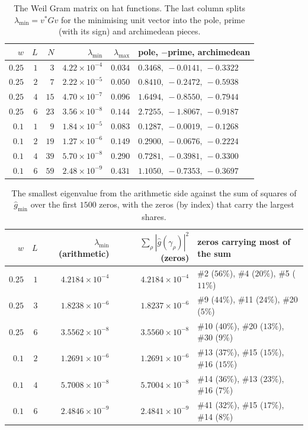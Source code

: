 \begin{table}[ht]
\centering\small
\begin{tabular}{@{}rrrrrl@{}}
\toprule
$w$ & $L$ & $N$ & $\lambda_{\min}$ & $\lambda_{\max}$ & pole, $-$prime, archimedean\\
\midrule
$0.25$ & $1$ & $3$ & $4.22\times10^{-4}$ & $0.034$ & $0.3468,\ -0.0141,\ -0.3322$\\
$0.25$ & $2$ & $7$ & $2.22\times10^{-5}$ & $0.050$ & $0.8410,\ -0.2472,\ -0.5938$\\
$0.25$ & $4$ & $15$ & $4.70\times10^{-7}$ & $0.096$ & $1.6494,\ -0.8550,\ -0.7944$\\
$0.25$ & $6$ & $23$ & $3.56\times10^{-8}$ & $0.144$ & $2.7255,\ -1.8067,\ -0.9187$\\
$0.1$ & $1$ & $9$ & $1.84\times10^{-5}$ & $0.083$ & $0.1287,\ -0.0019,\ -0.1268$\\
$0.1$ & $2$ & $19$ & $1.27\times10^{-6}$ & $0.149$ & $0.2900,\ -0.0676,\ -0.2224$\\
$0.1$ & $4$ & $39$ & $5.70\times10^{-8}$ & $0.290$ & $0.7281,\ -0.3981,\ -0.3300$\\
$0.1$ & $6$ & $59$ & $2.48\times10^{-9}$ & $0.431$ & $1.1050,\ -0.7353,\ -0.3697$\\
\bottomrule
\end{tabular}
\caption{The Weil Gram matrix on hat functions. The last column splits $\lambda_{\min}=v^*Gv$ for the minimising unit vector into the pole, prime (with its sign) and archimedean pieces.}
\label{cp:tab:weil}
\end{table}

\begin{table}[ht]
\centering\small
\begin{tabular}{@{}rrrrl@{}}
\toprule
$w$ & $L$ & $\lambda_{\min}$ (arithmetic) & $\sum_\rho|\hat g(\gamma_\rho)|^2$ (zeros) & zeros carrying most of the sum\\
\midrule
$0.25$ & $1$ & $4.2184\times10^{-4}$ & $4.2184\times10^{-4}$ & \#2 ($56\%$), \#4 ($20\%$), \#5 ($11\%$)\\
$0.25$ & $3$ & $1.8238\times10^{-6}$ & $1.8237\times10^{-6}$ & \#9 ($44\%$), \#11 ($24\%$), \#20 ($5\%$)\\
$0.25$ & $6$ & $3.5562\times10^{-8}$ & $3.5560\times10^{-8}$ & \#10 ($40\%$), \#20 ($13\%$), \#30 ($9\%$)\\
$0.1$ & $2$ & $1.2691\times10^{-6}$ & $1.2691\times10^{-6}$ & \#13 ($37\%$), \#15 ($15\%$), \#16 ($15\%$)\\
$0.1$ & $4$ & $5.7008\times10^{-8}$ & $5.7004\times10^{-8}$ & \#14 ($36\%$), \#13 ($23\%$), \#16 ($7\%$)\\
$0.1$ & $6$ & $2.4846\times10^{-9}$ & $2.4841\times10^{-9}$ & \#41 ($32\%$), \#15 ($17\%$), \#14 ($8\%$)\\
\bottomrule
\end{tabular}
\caption{The smallest eigenvalue from the arithmetic side against the sum of squares of $\hat g_{\min}$ over the first $1500$ zeros, with the zeros (by index) that carry the largest shares.}
\label{cp:tab:weilcheck}
\end{table}

